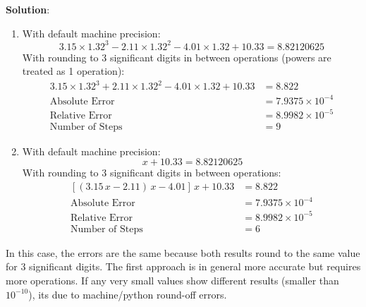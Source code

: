 \documentclass[12pt]{article}
\begin{document}
\begin{description}
    \color{red}
    \ifsolution
    {\bf Solution}:\\
    \begin{enumerate}[label=\textbf{(\alph*)}]
    \item With default machine precision:
    \begin{equation*}
        3.15 \times 1.32^3 - 2.11 \times 1.32^2 - 4.01 \times 1.32 + 10.33 = 8.82120625
    \end{equation*}
    With rounding to 3 significant digits in between operations (powers are treated as 1 operation):
    \begin{equation*}
    \begin{split}
     3.15 \times 1.32^3 + 2.11 \times 1.32^2 - 4.01 \times 1.32 + 10.33 &= 8.822    \\
    \text{Absolute Error} &= 7.9375 \times10^{-4} \\
    \text{Relative Error} &= 8.9982 \times10^{-5}	\\
    \text{Number of Steps} &= 9
    \end{split}
    \end{equation*}
    \item With default machine precision:
        \begin{equation*}
            [(3.15 \, x - 2.11) \, x - 4.01] \, x + 10.33 = 8.82120625
        \end{equation*}
        With rounding to 3 significant digits in between operations:
        \begin{equation*}
        \begin{split}
        [(3.15 \, x - 2.11) \, x - 4.01] \, x + 10.33 &= 8.822 \\
    \text{Absolute Error} &= 7.9375 \times10^{-4} \\
    \text{Relative Error} &= 8.9982 \times10^{-5} \\
    \text{Number of Steps} &= 6
    \end{split}
    \end{equation*}
    \end{enumerate}
    In this case, the errors are the same because both results round to the same value for 3 significant digits.
    The first approach is in general more accurate but requires more operations. If any very small values show different results (smaller than $10^{-10}$), its due to machine/python round-off errors.
    \fi
    \color{black}
    

\end{description}
\end{document}
